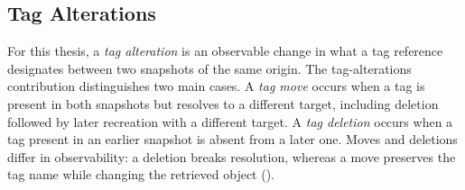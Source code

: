 \subsection{Tag Alterations}
\label{subsec:bg-tag-alterations}

For this thesis, a \emph{tag alteration} is an observable change in what a tag reference designates between two snapshots of the same origin.
The tag-alterations contribution distinguishes two main cases.
A \emph{tag move} occurs when a tag is present in both snapshots but resolves to a different target, including deletion followed by later recreation with a different target.
A \emph{tag deletion} occurs when a tag present in an earlier snapshot is absent from a later one.
Moves and deletions differ in observability: a deletion breaks resolution, whereas a move preserves the tag name while changing the retrieved object ().




